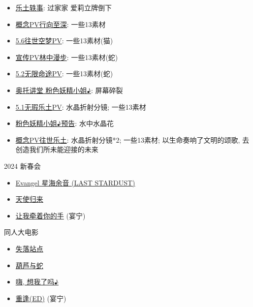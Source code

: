 \documentclass[a4paper]{article}
\begin{document}
\begin{itemize}
    \item \href{https://www.bilibili.com/video/BV1fr4y1n787/}{乐土轶事}: 过家家 爱莉立牌倒下
    \item \href{https://www.bilibili.com/video/BV1wF411b7wo/}{概念PV行向至深}: 一些13素材
    \item \href{https://www.bilibili.com/video/BV1KL4y137Jb/}{5.6往世空梦PV}: 一些13素材(猫)
    \item \href{https://www.bilibili.com/video/BV1F341127NT/}{宣传PV林中漫步}: 一些13素材(蛇)
    \item \href{https://www.bilibili.com/video/BV1V44y1b7cf/}{5.2无限命途PV}: 一些13素材(蛇)
    \item \href{https://www.bilibili.com/video/BV1Ny4y1573D/}{奥托讲堂 粉色妖精小姐♪}: 屏幕碎裂
    \item \href{https://www.bilibili.com/video/BV1iP4y1W7Kk/}{5.1无瑕乐土PV}: 水晶折射分镜; 一些13素材
    \item \href{https://www.bilibili.com/video/BV1Nw411R7bU/}{粉色妖精小姐♪预告}: 水中水晶花
    \item \href{https://www.bilibili.com/video/BV1T64y1X7mY/}{概念PV往世乐土}: 水晶折射分镜*2; 一些13素材; 以生命奏响了文明的颂歌, 去创造我们所未能迎接的未来
\end{itemize}

2024 新春会

\begin{itemize}
    \item \href{https://www.bilibili.com/video/BV13c411v7DR/}{Evangel 星海余音 (LAST STARDUST)}
    \item \href{https://www.bilibili.com/video/BV1pp4y1m7Uh/}{天使归来}
    \item \href{https://www.bilibili.com/video/BV1te411h7aj/}{让我牵着你的手} (宴宁)
\end{itemize}

同人大电影

\begin{itemize}
    \item \href{https://www.bilibili.com/video/BV1Ud4y1z7mY/?t=309}{失落站点}
    \item \href{https://www.bilibili.com/video/BV1w24y1R7s9/}{葫芦与蛇}
    \item \href{https://www.bilibili.com/video/BV1LD4y117nq/}{嗨, 想我了吗♪}
    \item \href{https://www.bilibili.com/video/BV17D4y117DV/}{重逢(ED)} (宴宁)
\end{itemize}
\end{document}

